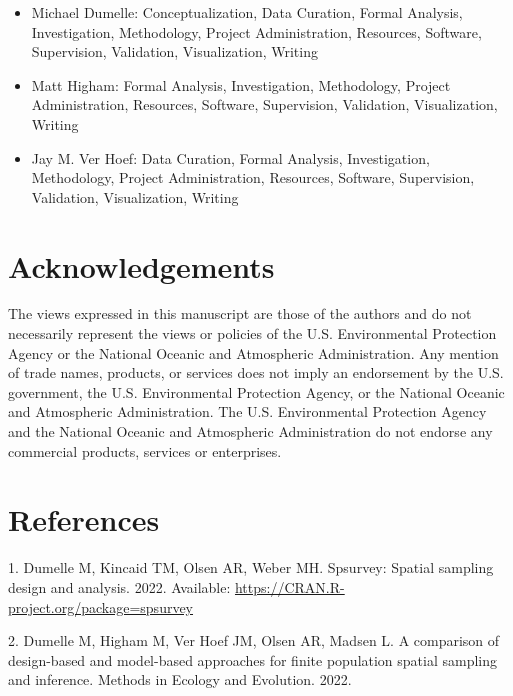 \documentclass[10pt,letterpaper]{article}
\begin{document}
\begin{itemize}
\item
  Michael Dumelle: Conceptualization, Data Curation, Formal Analysis,
  Investigation, Methodology, Project Administration, Resources,
  Software, Supervision, Validation, Visualization, Writing
\item
  Matt Higham: Formal Analysis, Investigation, Methodology, Project
  Administration, Resources, Software, Supervision, Validation,
  Visualization, Writing
\item
  Jay M. Ver Hoef: Data Curation, Formal Analysis, Investigation,
  Methodology, Project Administration, Resources, Software, Supervision,
  Validation, Visualization, Writing
\end{itemize}

\hypertarget{acknowledgements}{%
\section*{Acknowledgements}\label{acknowledgements}}

The views expressed in this manuscript are those of the authors and do
not necessarily represent the views or policies of the U.S.
Environmental Protection Agency or the National Oceanic and Atmospheric
Administration. Any mention of trade names, products, or services does
not imply an endorsement by the U.S. government, the U.S. Environmental
Protection Agency, or the National Oceanic and Atmospheric
Administration. The U.S. Environmental Protection Agency and the
National Oceanic and Atmospheric Administration do not endorse any
commercial products, services or enterprises.

\hypertarget{references}{%
\section*{References}\label{references}}

\hypertarget{refs}{}
\leavevmode\hypertarget{ref-dumelle2022spsurvey}{}%
1. Dumelle M, Kincaid TM, Olsen AR, Weber MH. Spsurvey: Spatial sampling
design and analysis. 2022. Available:
\url{https://CRAN.R-project.org/package=spsurvey}

\leavevmode\hypertarget{ref-dumelle2022comparison}{}%
2. Dumelle M, Higham M, Ver Hoef JM, Olsen AR, Madsen L. A comparison of
design-based and model-based approaches for finite population spatial
sampling and inference. Methods in Ecology and Evolution. 2022.
\end{document}

